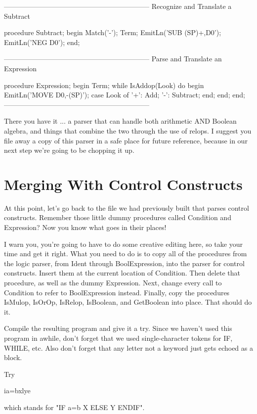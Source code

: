 \documentclass[float=false, crop=false]{standalone}
\begin{document}
\begin{code}
{---------------------------------------------------------------}
{ Recognize and Translate a Subtract }

procedure Subtract;
begin
   Match('-');
   Term;
   EmitLn('SUB (SP)+,D0');
   EmitLn('NEG D0');
end;


{---------------------------------------------------------------}
{ Parse and Translate an Expression }

procedure Expression;
begin
   Term;
   while IsAddop(Look) do begin
      EmitLn('MOVE D0,-(SP)');
      case Look of
       '+': Add;
       '-': Subtract;
      end;
   end;
end;
{---------------------------------------------------------------}
\end{code}

There you have it ... a parser that can handle both arithmetic AND Boolean
algebra, and things that combine the two through the use of relops. I suggest
you file away a copy of this parser in a safe place for future reference,
because in our next step we're going to be chopping it up.

\section{Merging With Control Constructs}

At this point, let's go back to the file we had previously built that parses
control constructs. Remember those little dummy procedures called Condition and
Expression? Now you know what goes in their places!

I warn you, you're going to have to do some creative editing here, so take your
time and get it right. What you need to do is to copy all of the procedures from
the logic parser, from Ident through BoolExpression, into the parser for control
constructs. Insert them at the current location of Condition. Then delete that
procedure, as well as the dummy Expression. Next, change every call to Condition
to refer to BoolExpression instead. Finally, copy the procedures IsMulop,
IsOrOp, IsRelop, IsBoolean, and GetBoolean into place. That should do it.

Compile the resulting program and give it a try. Since we haven't used this
program in awhile, don't forget that we used single-character tokens for IF,
WHILE, etc. Also don't forget that any letter not a keyword just gets echoed as
a block.

Try

     ia=bxlye

which stands for "IF a=b X ELSE Y ENDIF".
\end{document}
